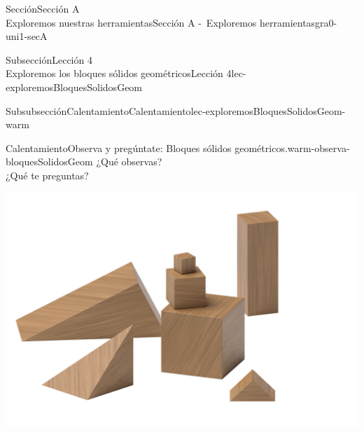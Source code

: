\begin{sectionptx}{Sección}{{\Large Sección A\\}Exploremos nuestras herramientas}{}{Sección A -~Exploremos herramientas}{}{}{gra0-uni1-secA}
\begin{subsectionptx}{Subsección}{{\normalsize Lección 4\\[-0.05cm]}Exploremos los bloques sólidos geométricos}{}{Lección 4}{}{}{lec-exploremosBloquesSolidosGeom}
%
%
\typeout{************************************************}
\typeout{************************************************}
%
\begin{subsubsectionptx}{Subsubsección}{Calentamiento}{}{Calentamiento}{}{}{lec-exploremosBloquesSolidosGeom-warm}
\begin{exploration}{Calentamiento}{Observa y pregúntate: Bloques sólidos geométricos.}{warm-observa-bloquesSolidosGeom}%
¿Qué observas?\\
 ¿Qué te preguntas?%
\begin{image}{0.0}{1}{0.0}{}%
\includegraphics[max width=\linewidth, center]{external/png-source/K.1.A Beta Student Workbook.Geoblocks.png}
\end{image}%
\end{exploration}%
\end{subsubsectionptx}
%
%
\typeout{************************************************}
\typeout{************************************************}
%

\end{subsectionptx}
\end{sectionptx}
